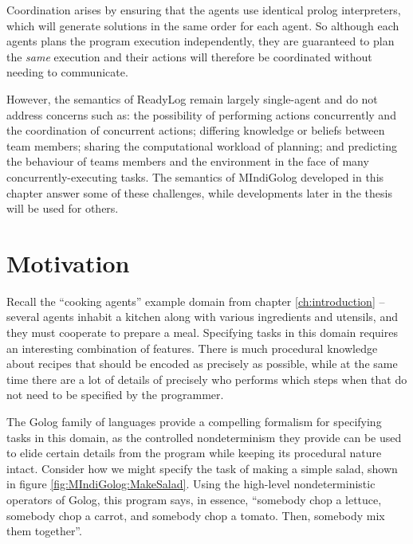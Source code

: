 Coordination arises by ensuring that the agents use identical prolog
interpreters, which will generate solutions in the same order for
each agent. So although each agents plans the program execution independently,
they are guaranteed to plan the \emph{same} execution and their actions
will therefore be coordinated without needing to communicate.

However, the semantics of ReadyLog remain largely single-agent and
do not address concerns such as: the possibility of performing actions
concurrently and the coordination of concurrent actions; differing
knowledge or beliefs between team members; sharing the computational
workload of planning; and predicting the behaviour of teams members
and the environment in the face of many concurrently-executing tasks.
The semantics of MIndiGolog developed in this chapter answer some
of these challenges, while developments later in the thesis will be
used for others.


\section{Motivation\label{sec:MIndiGolog:Motivation}}

Recall the {}``cooking agents'' example domain from chapter \ref{ch:introduction}
-- several agents inhabit a kitchen along with various ingredients
and utensils, and they must cooperate to prepare a meal. Specifying
tasks in this domain requires an interesting combination of features.
There is much procedural knowledge about recipes that should be encoded
as precisely as possible, while at the same time there are a lot of
details of precisely who performs which steps when that do not need
to be specified by the programmer.

The Golog family of languages provide a compelling formalism for specifying
tasks in this domain, as the controlled nondeterminism they provide
can be used to elide certain details from the program while keeping
its procedural nature intact. Consider how we might specify the task
of making a simple salad, shown in figure \ref{fig:MIndiGolog:MakeSalad}.
Using the high-level nondeterministic operators of Golog, this program
says, in essence, {}``somebody chop a lettuce, somebody chop a carrot,
and somebody chop a tomato. Then, somebody mix them together''.


